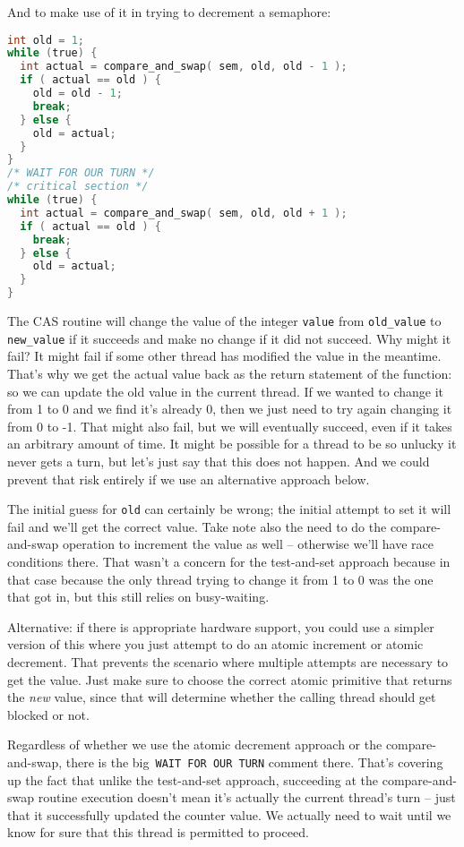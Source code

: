 And to make use of it in trying to decrement a semaphore:

\begin{lstlisting}[language=C]
int old = 1;
while (true) {
  int actual = compare_and_swap( sem, old, old - 1 );
  if ( actual == old ) {
    old = old - 1;
    break;
  } else {
    old = actual;
  }
}
/* WAIT FOR OUR TURN */
/* critical section */
while (true) {
  int actual = compare_and_swap( sem, old, old + 1 );
  if ( actual == old ) {
    break;
  } else {
    old = actual;
  }
}
\end{lstlisting}

The CAS routine will change the value of the integer \texttt{value} from \texttt{old\_value} to \texttt{new\_value} if it succeeds and make no change if it did not succeed. Why might it fail? It might fail if some other thread has modified the value in the meantime. That's why we get the actual value back as the return statement of the function: so we can update the old value in the current thread. If we wanted to change it from 1 to 0 and we find it's already 0, then we just need to try again changing it from 0 to -1. That might also fail, but we will eventually succeed, even if it takes an arbitrary amount of time. It might be possible for a thread to be so unlucky it never gets a turn, but let's just say that this does not happen. And we could prevent that risk entirely if we use an alternative approach below.

The initial guess for \texttt{old} can certainly be wrong; the initial attempt to set it will fail and we'll get the correct value. Take note also the need to do the compare-and-swap operation to increment the value as well -- otherwise we'll have race conditions there. That wasn't a concern for the test-and-set approach because in that case because the only thread trying to change it from 1 to 0 was the one that got in, but this still relies on busy-waiting.

Alternative: if there is appropriate hardware support, you could use a simpler version of this where you just attempt to do an atomic increment or atomic decrement. That prevents the scenario where multiple attempts are necessary to get the value. Just make sure to choose the correct atomic primitive that returns the \textit{new} value, since that will determine whether the calling thread should get blocked or not. 

Regardless of whether we use the atomic decrement approach or the compare-and-swap, there is the big~\texttt{WAIT FOR OUR TURN} comment there. That's covering up the fact that unlike the test-and-set approach, succeeding at the compare-and-swap routine execution doesn't mean it's actually the current thread's turn -- just that it successfully updated the counter value. We actually need to wait until we know for sure that this thread is permitted to proceed.

